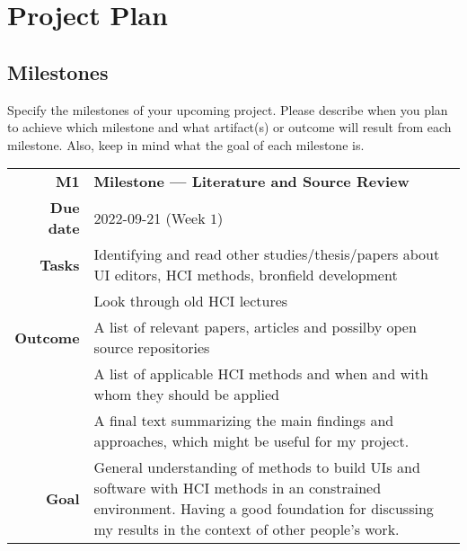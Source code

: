 \section{Project Plan}
\label{sec:plan}



\subsection{Milestones}
\label{subsec:milestone}
Specify the milestones of your upcoming project. Please describe when you plan to achieve which milestone and what artifact(s) or outcome will result from each milestone. Also, keep in mind what the goal of each milestone is.


\small
\colorbox{usethiscolorhere}{
    \centering
    \begin{tabularx}{\textwidth}{@{} r Y @{}}
        \textbf{M1}
        & \textbf{Milestone --- Literature and Source Review}\vspace{2mm}\\
        \textbf{Due date} & 2022-09-21 (Week $1$)\vspace{2mm}\\
        \textbf{Tasks} & Identifying and read other studies/thesis/papers about UI editors, HCI methods, bronfield development\\&Look through old HCI lectures\vspace{2mm}\\
        \textbf{Outcome} & A list of relevant papers, articles and possilby open source repositories\\
        & A list of applicable HCI methods and when and with whom they should be applied\\
        & A final text summarizing the main findings and approaches, which might be useful for my project. \vspace{2mm}\\
        \textbf{Goal} & General understanding of methods to build UIs and software with HCI methods in an constrained environment. Having a good foundation for discussing my results in the context of other people's work.\vspace{2mm}\\
        
    \end{tabularx}
}

